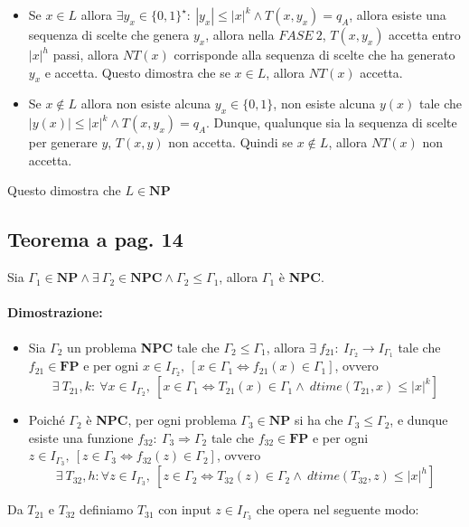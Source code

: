 \begin{itemize}
{        \begin{itemize}
            \item {
                Se $x \in L$ allora $\exists y_{x} \in \{0, 1\}^{\star}:\ |y_{x}| \leq |x|^k \land T(x, y_{x}) = q_{A}$, allora 
                esiste  una sequenza di scelte che genera $y_{x}$, allora nella $FASE\ 2$, $T(x, y_{x})$ accetta entro $|x|^h$ passi, 
                allora $NT(x)$ corrisponde alla sequenza di scelte che ha generato $y_{x}$ e accetta. Questo dimostra che se $x \in L$, allora 
                $NT(x)$ accetta.
            }
            \item {
                Se $x \notin L$ allora non esiste alcuna $y_{x} \in \{0, 1\}$, non esiste alcuna $y(x)$ tale che $|y(x)| \leq |x|^k \land T(x, y_{x}) = q_{A}$.
                Dunque, qualunque sia la sequenza di scelte per generare  $y$, $T(x, y)$ non accetta. Quindi se $x \notin L$, allora $NT(x)$ non accetta. 
            }
        \end{itemize}
    }
\end{itemize}

Questo dimostra che $L \in \textbf{NP}$

\newpage
\subsection{Teorema a pag. 14}

Sia $\Gamma_{1} \in \textbf{NP} \land \exists\ \Gamma_{2} \in \textbf{NPC} \land \Gamma_{2} \leq \Gamma_{1}$, allora 
$\Gamma_{1}$ è \textbf{NPC}.

\paragraph*{Dimostrazione: }

\begin{itemize}
    \item []{
        Sia $\Gamma_{2}$ un problema \textbf{NPC} tale che $\Gamma_{2} \leq \Gamma_{1}$, allora $\exists\ f_{21}:\ I_{\Gamma_{2}} \rightarrow I_{\Gamma_{1}}$
        tale che $f_{21} \in \textbf{FP}$ e per ogni $x \in I_{\Gamma_{2}},\ [x \in \Gamma_{1} \Leftrightarrow f_{21}(x) \in \Gamma_{1}]$, 
        ovvero $$\exists\ T_{21}, k:\ \forall x \in I_{\Gamma_{2}},\ [x \in \Gamma_{1} \Leftrightarrow T_{21}(x) \in \Gamma_{1} \land\ dtime(T_{21}, x) \leq |x|^k]$$
    }
    \item []{
        Poiché $\Gamma_{2}$ è \textbf{NPC}, per ogni problema $\Gamma_{3} \in \textbf{NP}$ si ha che $\Gamma_{3} \leq \Gamma_{2}$, e dunque esiste una funzione $f_{32}:\ \Gamma_{3} \Rightarrow \Gamma_{2}$
        tale che $f_{32} \in \textbf{FP}$ e per ogni $z \in I_{\Gamma_{3}},\ [z \in \Gamma_{3} \Leftrightarrow f_{32}(z) \in \Gamma_{2}]$, ovvero 
        $$\exists\ T_{32}, h: \forall z \in I_{\Gamma_{3}},\ [z \in \Gamma_{2} \Leftrightarrow T_{32}(z) \in \Gamma_{2} \land\ dtime(T_{32}, z) \leq |x|^h]$$
    }
\end{itemize}
Da $T_{21}$ e $T_{32}$ definiamo $T_{31}$ con input $z \in I_{\Gamma_{3}}$ che opera nel seguente modo:

